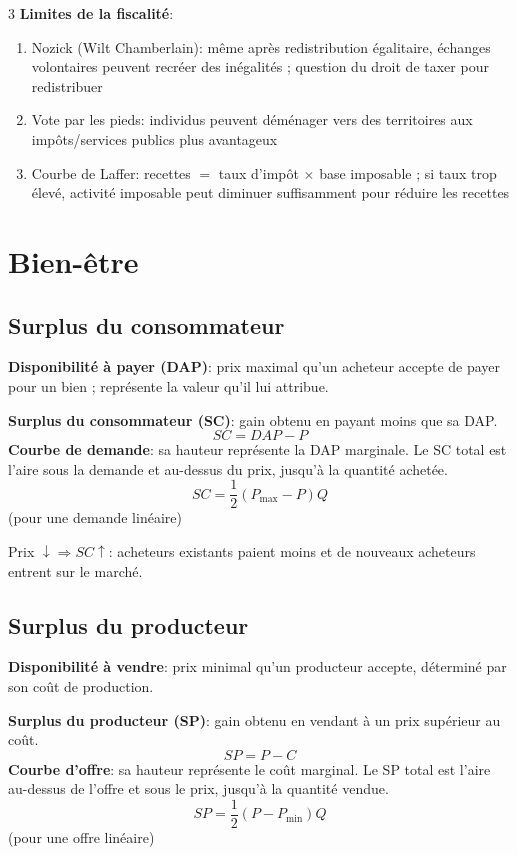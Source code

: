 \documentclass[12pt, a4paper]{article}
\begin{document}
\begin{multicols*}{3}
\textbf{Limites de la fiscalité}:
\begin{enumerate}[\roman*.]
  \item Nozick (Wilt Chamberlain): même après redistribution égalitaire, échanges volontaires peuvent recréer des inégalités ; question du droit de taxer pour redistribuer
  \item Vote par les pieds: individus peuvent déménager vers des territoires aux impôts/services publics plus avantageux
  \item Courbe de Laffer: recettes $=$ taux d'impôt $\times$ base imposable ; si taux trop élevé, activité imposable peut diminuer suffisamment pour réduire les recettes
\end{enumerate}

\colbreak
\section{Bien-être}

\subsection{Surplus du consommateur}

\textbf{Disponibilité à payer (DAP)}: prix maximal qu'un acheteur accepte de payer pour un bien ; représente la valeur qu'il lui attribue.

\textbf{Surplus du consommateur (SC)}: gain obtenu en payant moins que sa DAP.
\[
\boxed{SC=DAP-P}
\]
\textbf{Courbe de demande}: sa hauteur représente la DAP marginale. Le SC total est l'aire sous la demande et au-dessus du prix, jusqu'à la quantité achetée.
\[
SC=\frac12(P_{\max}-P)Q
\]
(pour une demande linéaire)

Prix $\downarrow\Rightarrow SC\uparrow$: acheteurs existants paient moins et de nouveaux acheteurs entrent sur le marché.

\subsection{Surplus du producteur}

\textbf{Disponibilité à vendre}: prix minimal qu'un producteur accepte, déterminé par son coût de production.

\textbf{Surplus du producteur (SP)}: gain obtenu en vendant à un prix supérieur au coût.
\[
\boxed{SP=P-C}
\]
\textbf{Courbe d'offre}: sa hauteur représente le coût marginal. Le SP total est l'aire au-dessus de l'offre et sous le prix, jusqu'à la quantité vendue.
\[
SP=\frac12(P-P_{\min})Q
\]
(pour une offre linéaire)


\end{multicols*}
\end{document}
